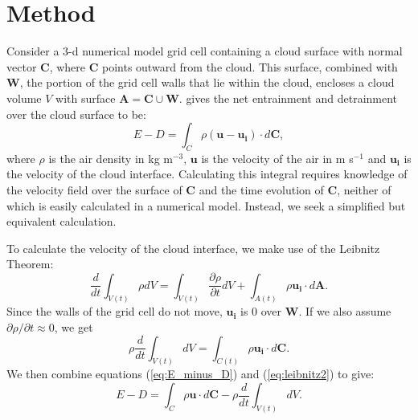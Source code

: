 \documentclass[12pt]{article}
\begin{document}
\section{Method}

Consider a 3-d numerical model grid cell containing a cloud surface with 
normal vector $\mathbf{C}$, where $\mathbf{C}$ points outward from the cloud.
This surface, combined with $\mathbf{W}$, the portion of the grid cell walls
that lie within the cloud, encloses a cloud volume $V$ with surface $\mathbf{A}
= \mathbf{C} \cup \mathbf{W}$.  \cite{Siebesma1998} gives the net entrainment and
detrainment over the cloud surface to be:
\begin{equation}
\label{eq:E_minus_D} 
E - D = \int_C \rho ( \mathbf{u} -  \mathbf{u_i}) \cdot d\mathbf{C},
\end{equation}
where $\rho$ is the air density in kg m$^{-3}$, $\mathbf{u}$ is the velocity
of the air in m s$^{-1}$ and $\mathbf{u_i}$ is the velocity of the cloud 
interface.  Calculating this integral requires knowledge of the velocity field
over the surface of $\mathbf{C}$ and the time evolution of $\mathbf{C}$, 
neither of which is easily calculated in a numerical model.  Instead, we seek a
simplified but equivalent calculation.

To calculate the velocity of the cloud interface, we make use of the Leibnitz 
Theorem:
\begin{equation}
\label{eq:leibnitz} 
\frac{d}{dt}\int_{V(t)} \rho dV = 
  \int_{V(t)} \frac{\partial \rho}{ \partial t} dV 
  + \int_{A(t)} \rho \mathbf{u_i}\cdot d\mathbf{A}.
\end{equation}
Since the walls of the grid cell do not move, $\mathbf{u_i}$ is 0 over 
$\mathbf{W}$.  If we also assume ${\partial \rho}/{ \partial t} \approx 0$, we
get
\begin{equation}
\label{eq:leibnitz2} 
    \rho \frac{d}{dt}\int_{V(t)} dV = 
    \int_{C(t)} \rho \mathbf{u_i}\cdot d\mathbf{C}.
\end{equation}
We then combine equations (\ref{eq:E_minus_D}) and (\ref{eq:leibnitz2}) to give:
\begin{equation}
\label{eq:step1} 
      E - D = \int_C \rho \mathbf{u} \cdot d\mathbf{C} 
            - \rho \frac{d}{dt}\int_{V(t)} dV.
\end{equation}
\end{document}
